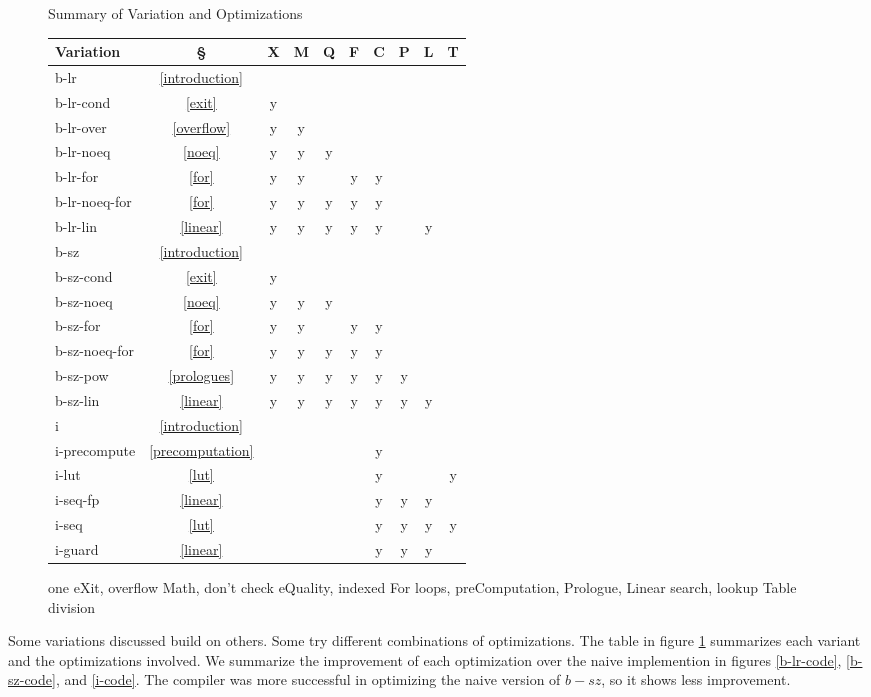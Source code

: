 \documentclass[twocolumn]{article}
\begin{document}
\setlength{\tabcolsep}{5pt}
\begin{figure}[ht]
  \caption{Summary of Variation and Optimizations}
\begin{tabular}{l*{9}c}
  Variation & \S & X & M & Q & F & C & P & L & T \\
	\hline
  b-lr & \ref{introduction} \\
  b-lr-cond & \ref{exit} & y \\
  b-lr-over & \ref{overflow} & y & y \\
  b-lr-noeq & \ref{noeq} & y & y & y \\
  b-lr-for & \ref{for} & y & y & & y & y \\
  b-lr-noeq-for & \ref{for} & y & y & y & y & y \\
  b-lr-lin & \ref{linear} & y & y & y & y & y & & y & \\

  b-sz & \ref{introduction} \\
  b-sz-cond & \ref{exit} & y \\
  b-sz-noeq & \ref{noeq} & y & y & y \\
  b-sz-for & \ref{for} & y & y & & y & y \\
  b-sz-noeq-for & \ref{for} & y & y & y & y & y \\
  b-sz-pow & \ref{prologues} & y & y & y & y & y & y \\
  b-sz-lin & \ref{linear} & y & y & y & y & y & y & y & \\
	
  i & \ref{introduction} \\
  i-precompute & \ref{precomputation} & & & & & y \\
  i-lut        & \ref{lut} & & & & & y & & & y \\
  i-seq-fp     & \ref{linear} & & & & & y & y & y \\
  i-seq        & \ref{lut} & & & & & y & y & y & y \\
  i-guard     & \ref{linear} & & & & & y & y & y \\
\end{tabular}
  \caption{one eXit, overflow Math, don't check eQuality, indexed For loops, preComputation, Prologue, Linear search, lookup Table division}
  \label{table}
\end{figure}

Some variations discussed build on others. Some try different combinations of optimizations. The table in figure \ref{table} summarizes each variant and the optimizations involved. We summarize the improvement of each optimization over the naive implemention in figures \ref{b-lr-code}, \ref{b-sz-code}, and \ref{i-code}. The compiler was more successful in optimizing the naive version of $b-sz$, so it shows less improvement.
\end{document}
